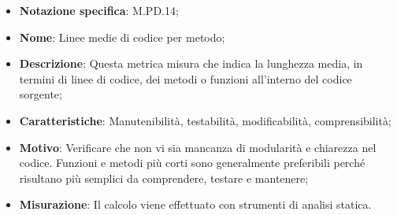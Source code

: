 \begin{itemize}
    \item \textbf{Notazione specifica}: M.PD.14;
    \item \textbf{Nome}: Linee medie di codice per metodo;
    \item \textbf{Descrizione}: Questa metrica misura che indica la lunghezza media, in termini di linee di codice, dei metodi o funzioni all'interno del codice sorgente;
    \item \textbf{Caratteristiche}: Manutenibilità, testabilità, modificabilità, comprensibilità;
    \item \textbf{Motivo}: Verificare che non vi sia mancanza di modularità e chiarezza nel codice. Funzioni e metodi più corti sono generalmente preferibili perché risultano più semplici da comprendere, testare e mantenere; 
    \item \textbf{Misurazione}: Il calcolo viene effettuato con strumenti di analisi statica.
\end{itemize}
